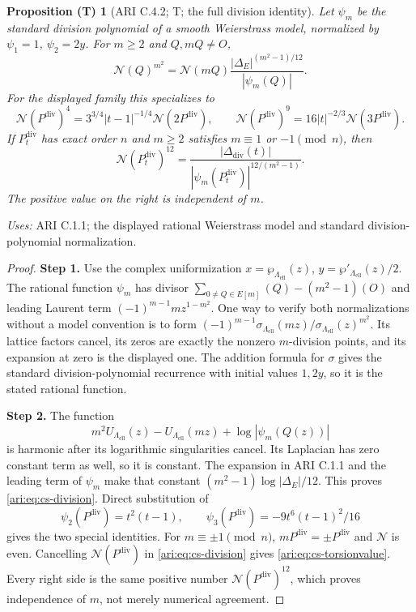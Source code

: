 \documentclass[11pt,a4paper]{article}
\theoremstyle{plain}
\newtheorem{proposition}[theorem]{Proposition (T)}
\theoremstyle{definition}
\begin{document}
\begin{proposition}[ARI C.4.2; T; the full division identity]\label{ari:C.4.2}
Let $\psi_m$ be the standard division polynomial of a smooth
Weierstrass model, normalized by $\psi_1=1$, $\psi_2=2y$.
For $m\ge2$ and $Q,mQ\ne O$,
\begin{equation}\label{ari:eq:cs-division}
 \mathcal N(Q)^{m^2}
       =\mathcal N(mQ)\frac{|\Delta_E|^{(m^2-1)/12}}{|\psi_m(Q)|}.
\end{equation}
For the displayed family this specializes to
\[
 \mathcal N(P^{\mathrm{div}})^4=3^{3/4}|t-1|^{-1/4}\mathcal N(2P^{\mathrm{div}}),\qquad
 \mathcal N(P^{\mathrm{div}})^9=16|t|^{-2/3}\mathcal N(3P^{\mathrm{div}}).
\]
If $P^{\mathrm{div}}_t$ has exact order $n$ and $m\ge2$ satisfies
$m\equiv1$ or $-1\pmod n$, then
\begin{equation}\label{ari:eq:cs-torsionvalue}
 \mathcal N(P^{\mathrm{div}}_t)^{12}
       =\frac{|\Delta_{\mathrm{div}}(t)|}{|\psi_m(P^{\mathrm{div}}_t)|^{12/(m^2-1)}}.
\end{equation}
The positive value on the right is independent of $m$.
\end{proposition}
\noindent\textit{Uses:} ARI C.1.1; the displayed rational Weierstrass model and standard division-polynomial normalization.\par
\begin{proof}
\noindent\textbf{Step 1.} Use the complex uniformization $x=\wp_{\Lambda_{\mathrm{ell}}}(z)$,
$y=\wp'_{\Lambda_{\mathrm{ell}}}(z)/2$. The rational function $\psi_m$ has divisor
$\sum_{0\ne Q\in E[m]}(Q)-(m^2-1)(O)$ and leading Laurent term
$(-1)^{m-1}m z^{1-m^2}$. One way to verify both normalizations without
a model convention is to form
$(-1)^{m-1}\sigma_{\Lambda_{\mathrm{ell}}}(mz)/\sigma_{\Lambda_{\mathrm{ell}}}(z)^{m^2}$.
Its lattice factors cancel, its zeros are exactly the nonzero
$m$-division points, and its expansion at zero is the displayed
one. The addition formula for $\sigma$ gives the standard
division-polynomial recurrence with initial values $1,2y$, so it is
the stated rational function.


\noindent\textbf{Step 2.} The function
\[
 m^2U_{\Lambda_{\mathrm{ell}}}(z)-U_{\Lambda_{\mathrm{ell}}}(mz)
                    +\log|\psi_m(Q(z))|
\]
is harmonic after its logarithmic singularities cancel. Its
Laplacian has zero constant term as well, so it is constant.
The expansion in ARI C.1.1 and the leading term of $\psi_m$ make that
constant $(m^2-1)\log|\Delta_E|/12$. This proves
\eqref{ari:eq:cs-division}. Direct substitution of
\[
 \psi_2(P^{\mathrm{div}})=t^2(t-1),\qquad
 \psi_3(P^{\mathrm{div}})=-9t^6(t-1)^2/16
\]
gives the two special identities. For $m\equiv\pm1\pmod n$,
$mP^{\mathrm{div}}=\pm P^{\mathrm{div}}$ and $\mathcal N$ is even. Cancelling $\mathcal N(P^{\mathrm{div}})$ in
\eqref{ari:eq:cs-division} gives \eqref{ari:eq:cs-torsionvalue}.
Every right side is the same positive number $\mathcal N(P^{\mathrm{div}})^{12}$, which
proves independence of $m$, not merely numerical agreement.
\end{proof}
\end{document}
